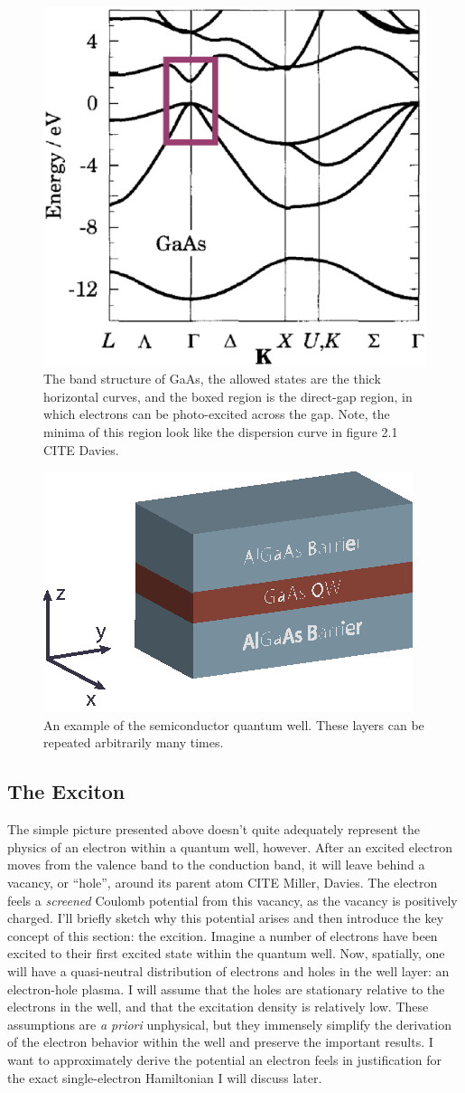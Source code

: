 \begin{figure}[h!]
\centering
\includegraphics[width = .3\textwidth]{GaAsBstruct.eps}
\caption{\doublespacing The band structure of GaAs, the allowed states are the thick horizontal curves, and the boxed region is the direct-gap region, in which electrons can be photo-excited across the gap. Note, the minima of this region look like the dispersion curve in figure 2.1 CITE Davies.}
\label{GaAsBstruct}
\end{figure}


\begin{figure}[h!]
\centering
\includegraphics[width = .4\textwidth]{Well.eps}
\caption{\doublespacing An example of the semiconductor quantum well. These layers can be repeated arbitrarily many times.}
\label{GaAsBstruct}
\end{figure}

\newpage
\subsection{The Exciton}

\indent The simple picture presented above doesn't quite adequately represent the physics of an electron within a quantum well, however. After an excited electron moves from the valence band to the conduction band, it will leave behind a vacancy, or ``hole'', around its parent atom CITE Miller, Davies. The electron feels a \textit{screened} Coulomb potential from this vacancy, as the vacancy is positively charged. I'll briefly sketch why this potential arises and then introduce the key concept of this section: the excition. Imagine a number of electrons have been excited to their first excited state within the quantum well. Now, spatially, one will have a quasi-neutral distribution of electrons and holes in the well layer: an electron-hole plasma. I will assume that the holes are stationary relative to the electrons in the well, and that the excitation density is relatively low. These assumptions are \textit{a priori} unphysical, but they immensely simplify the derivation of the electron behavior within the well and preserve the important results. I want to approximately derive the potential an electron feels in justification for the exact single-electron Hamiltonian I will discuss later. 

